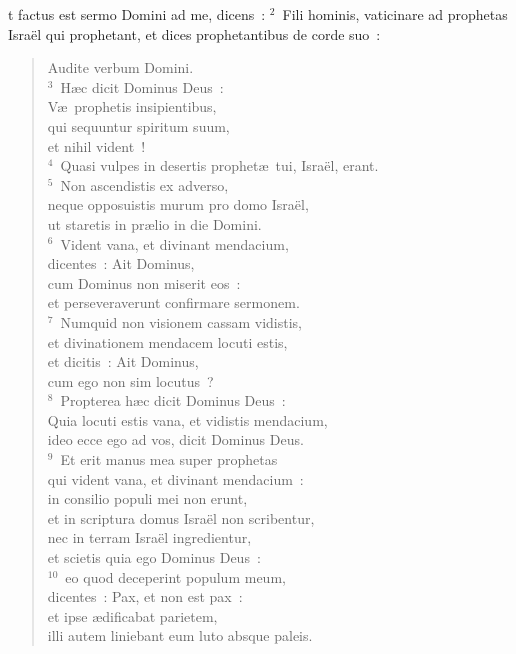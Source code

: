 \bchapter
{}t factus est sermo Domini ad me, dicens~:
${}^{2}$~Fili hominis, vaticinare ad prophetas Isra\"el qui prophetant, et dices prophetantibus de corde suo~: \begin{flushleft}\begin{verse}Audite verbum Domini.\\
${}^{3}$~H\ae c dicit Dominus Deus~:\\ V\ae\ prophetis insipientibus,\\ qui sequuntur spiritum suum,\\ et nihil vident~!\\
${}^{4}$~Quasi vulpes in desertis prophet\ae\ tui, Isra\"el, erant.\\
${}^{5}$~Non ascendistis ex adverso,\\ neque opposuistis murum pro domo Isra\"el,\\ ut staretis in pr\ae lio in die Domini.\\
${}^{6}$~Vident vana, et divinant mendacium,\\ dicentes~: Ait Dominus,\\ cum Dominus non miserit eos~:\\ et perseveraverunt confirmare sermonem.\\
${}^{7}$~Numquid non visionem cassam vidistis,\\ et divinationem mendacem locuti estis,\\ et dicitis~: Ait Dominus,\\ cum ego non sim locutus~?\\
${}^{8}$~Propterea h\ae c dicit Dominus Deus~:\\ Quia locuti estis vana, et vidistis mendacium,\\ ideo ecce ego ad vos, dicit Dominus Deus.\\
${}^{9}$~Et erit manus mea super prophetas\\ qui vident vana, et divinant mendacium~:\\ in consilio populi mei non erunt,\\ et in scriptura domus Isra\"el non scribentur,\\ nec in terram Isra\"el ingredientur,\\ et scietis quia ego Dominus Deus~:\\
${}^{10}$~eo quod deceperint populum meum,\\ dicentes~: Pax, et non est pax~:\\ et ipse \ae dificabat parietem,\\ illi autem liniebant eum luto absque paleis.\\

\end{verse}
\end{flushleft}
